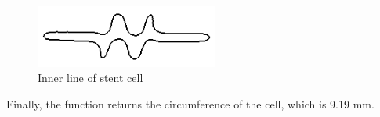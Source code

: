 \begin{figure}[h]
  \centering
  \begin{makeimage}
  \end{makeimage}
  \begin{latexonly}
    \includegraphics[width=6cm]{images/stent-cell}
  \end{latexonly}
  \begin{htmlonly}
  \end{htmlonly}  
  \caption{Inner line of stent cell}
  \label{fig:stent-cell}
\end{figure}

Finally, the  function returns the circumference of the cell, which is 9.19 mm.

